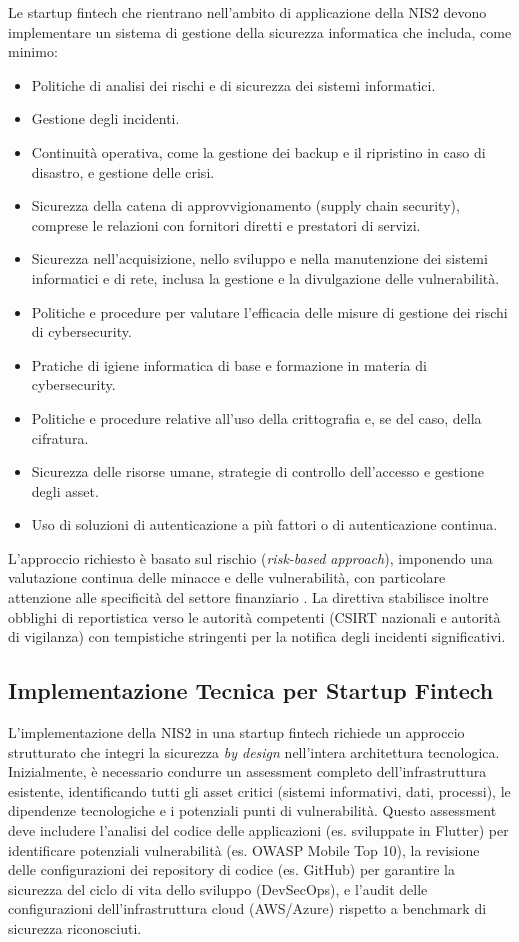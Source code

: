 Le startup fintech che rientrano nell'ambito di applicazione della NIS2 devono implementare un sistema di gestione della sicurezza informatica che includa, come minimo:
\begin{itemize}
    \item Politiche di analisi dei rischi e di sicurezza dei sistemi informatici.
    \item Gestione degli incidenti.
    \item Continuità operativa, come la gestione dei backup e il ripristino in caso di disastro, e gestione delle crisi.
    \item Sicurezza della catena di approvvigionamento (supply chain security), comprese le relazioni con fornitori diretti e prestatori di servizi.
    \item Sicurezza nell'acquisizione, nello sviluppo e nella manutenzione dei sistemi informatici e di rete, inclusa la gestione e la divulgazione delle vulnerabilità.
    \item Politiche e procedure per valutare l'efficacia delle misure di gestione dei rischi di cybersecurity.
    \item Pratiche di igiene informatica di base e formazione in materia di cybersecurity.
    \item Politiche e procedure relative all'uso della crittografia e, se del caso, della cifratura.
    \item Sicurezza delle risorse umane, strategie di controllo dell'accesso e gestione degli asset.
    \item Uso di soluzioni di autenticazione a più fattori o di autenticazione continua.
\end{itemize}
L'approccio richiesto è basato sul rischio (\textit{risk-based approach}), imponendo una valutazione continua delle minacce e delle vulnerabilità, con particolare attenzione alle specificità del settore finanziario \cite{cybersecurity360NIS2}. La direttiva stabilisce inoltre obblighi di reportistica verso le autorità competenti (CSIRT nazionali e autorità di vigilanza) con tempistiche stringenti per la notifica degli incidenti significativi.

\subsection{Implementazione Tecnica per Startup Fintech}
L'implementazione della NIS2 in una startup fintech richiede un approccio strutturato che integri la sicurezza \textit{by design} nell'intera architettura tecnologica. Inizialmente, è necessario condurre un assessment completo dell'infrastruttura esistente, identificando tutti gli asset critici (sistemi informativi, dati, processi), le dipendenze tecnologiche e i potenziali punti di vulnerabilità. Questo assessment deve includere l'analisi del codice delle applicazioni (es. sviluppate in Flutter) per identificare potenziali vulnerabilità (es. OWASP Mobile Top 10), la revisione delle configurazioni dei repository di codice (es. GitHub) per garantire la sicurezza del ciclo di vita dello sviluppo (DevSecOps), e l'audit delle configurazioni dell'infrastruttura cloud (AWS/Azure) rispetto a benchmark di sicurezza riconosciuti.

